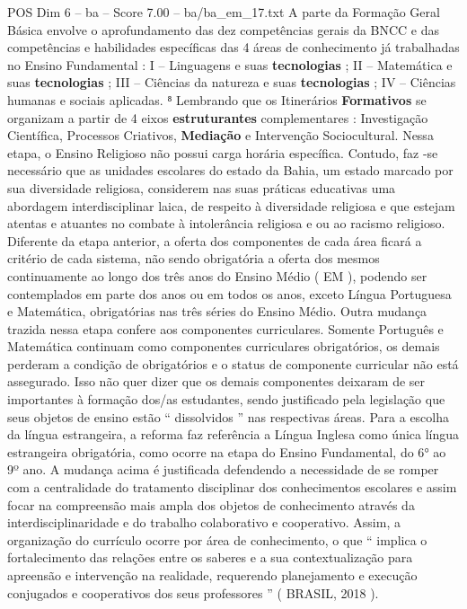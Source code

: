 \begin{textsample}{POS Dim 6 – ba – Score 7.00 – ba/ba\_em\_17.txt}
A parte da Formação Geral Básica envolve o aprofundamento das dez competências gerais da BNCC e das competências e habilidades específicas das 4 áreas de conhecimento já trabalhadas no Ensino Fundamental : I – Linguagens e suas \textbf{tecnologias} ; II – Matemática e suas \textbf{tecnologias} ; III – Ciências da natureza e suas \textbf{tecnologias} ; IV – Ciências humanas e sociais aplicadas. ⁸ Lembrando que os Itinerários \textbf{Formativos} se organizam a partir de 4 eixos \textbf{estruturantes} complementares : Investigação Científica, Processos Criativos, \textbf{Mediação} e Intervenção Sociocultural.
Nessa etapa, o Ensino Religioso não possui carga horária específica.
Contudo, faz -se necessário que as unidades escolares do estado da Bahia, um estado marcado por sua diversidade religiosa, considerem nas suas práticas educativas uma abordagem interdisciplinar laica, de respeito à diversidade religiosa e que estejam atentas e atuantes no combate à intolerância religiosa e ou ao racismo religioso.
Diferente da etapa anterior, a oferta dos componentes de cada área ficará a critério de cada sistema, não sendo obrigatória a oferta dos mesmos continuamente ao longo dos três anos do Ensino Médio ( EM ), podendo ser contemplados em parte dos anos ou em todos os anos, exceto Língua Portuguesa e Matemática, obrigatórias nas três séries do Ensino Médio.
Outra mudança trazida nessa etapa confere aos componentes curriculares.
Somente Português e Matemática continuam como componentes curriculares obrigatórios, os demais perderam a condição de obrigatórios e o status de componente curricular não está assegurado.
Isso não quer dizer que os demais componentes deixaram de ser importantes à formação dos/as estudantes, sendo justificado pela legislação que seus objetos de ensino estão “ dissolvidos ” nas respectivas áreas.
Para a escolha da língua estrangeira, a reforma faz referência a Língua Inglesa como única língua estrangeira obrigatória, como ocorre na etapa do Ensino Fundamental, do 6{\EmojiFont °} ao 9º ano.
A mudança acima é justificada defendendo a necessidade de se romper com a centralidade do tratamento disciplinar dos conhecimentos escolares e assim focar na compreensão mais ampla dos objetos de conhecimento através da interdisciplinaridade e do trabalho colaborativo e cooperativo.
Assim, a organização do currículo ocorre por área de conhecimento, o que “ implica o fortalecimento das relações entre os saberes e a sua contextualização para apreensão e intervenção na realidade, requerendo planejamento e execução conjugados e cooperativos dos seus professores ” ( BRASIL, 2018 ).

\end{textsample}
